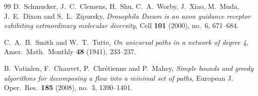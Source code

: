\documentclass[11pt]{article}
\theoremstyle{plain}
\theoremstyle{definition}
\theoremstyle{remark}
\begin{document}
\begin{thebibliography}{99}
 D.~Schmucker, J.~C.~Clemens, H.~Shu, C.~A.~Worby, J.~Xiao, M.~Muda,
J.~E.~Dixon and S.~L.~Zipursky,
\emph{Drosophila Dscam is an axon guidance receptor exhibiting extraordinary molecular
diversity}, Cell \textbf{101} (2000), no.~6, 671--684.

 C.~A.~B.~Smith and W.~T.~Tutte,
\emph{On unicursal paths in a network of degree 4},
Amer.\ Math.\ Monthly \textbf{48} (1941), 233--237.

 B.~Vatinlen, F.~Chauvet, P.~Chr\'etienne and P.~Mahey,
\emph{Simple bounds and greedy algorithms for decomposing a flow into a minimal set of
paths}, European J. Oper.\ Res.\ \textbf{185} (2008), no.~3, 1390--1401.

\end{thebibliography}
\end{document}
